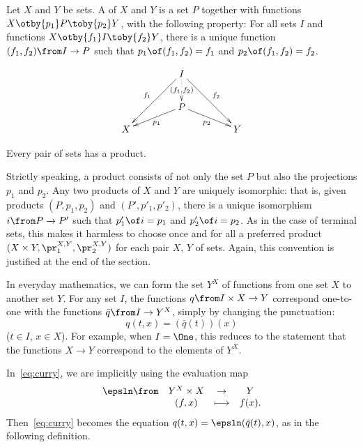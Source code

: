 \documentclass[12pt]{article}
\begin{document}
\begin{dfn}
Let $X$ and $Y$ be sets.  A  of $X$ and $Y$ is a set $P$
together with functions $X \otby{p_1} P \toby{p_2} Y$, with the following
property:
\medskip\noindent
For all sets $I$
and functions $X \otby{f_1} I \toby{f_2} Y$,
there is a unique function $(f_1, f_2)\from I \to P$
such that
$p_1 \of (f_1, f_2) = f_1$ and $p_2 \of (f_1, f_2) = f_2$.
\end{dfn}
\[
\begin{xy}
(0,20)*+{I}="test";
(0,8)*+{P}="prod";
(-20,0)*+{X}="first";
(20,0)*+{Y}="second";
{\ar_{f_1} "test"; "first"};
{\ar^{f_2} "test"; "second"};
{\ar@{.>}|{(f_1, f_2)} "test"; "prod"};
{\ar^{p_1} "prod"; "first"};
{\ar_{p_2} "prod"; "second"};
\end{xy}
\]
% 
\begin{axiom}
Every pair of sets has a product.
\end{axiom}

Strictly speaking, a product consists of not only the set $P$ but also the
projections $p_1$ and $p_2$.  Any two products of $X$ and $Y$ are uniquely
isomorphic: that is, given products $(P, p_1, p_2)$ and $(P', p'_1, p'_2)$,
there is a unique isomorphism $i\from P \to P'$ such that $p'_1 \of i =
p_1$ and $p'_2 \of i = p_2$.  As in the case of terminal sets, this makes
it harmless to choose once and for all a preferred product $(X \times Y,
\pr^{X, Y}_1, \pr^{X, Y}_2)$ for each pair $X$, $Y$ of sets.  Again, this
convention is justified at the end of the section.


% 
In everyday mathematics, we can form the set $Y^X$ of functions from one
set $X$ to another set $Y$.  For any set $I$, the functions $q \from I
\times X \to Y$ correspond one-to-one with the functions $\bar{q}\from I
\to Y^X$, simply by changing the punctuation:
% 
\begin{equation}        \label{eq:curry}
q(t, x)
=
(\bar{q}(t))(x)
\end{equation}
% 
($t \in I$, $x \in X$).  For example, when $I = \One$, this reduces to the
statement that the functions $X \to Y$ correspond to the elements of $Y^X$.

In~\eqref{eq:curry}, we are implicitly using the evaluation map
\[
\begin{array}{cccc}
\epsln\from     &Y^X \times X   &\to            &Y      \\
                &(f, x)         &\longmapsto    &f(x).
\end{array}
\]
Then~\eqref{eq:curry} becomes the equation $q(t, x) = \epsln (\bar{q}(t),
x)$, as in the following definition.
\end{document}
